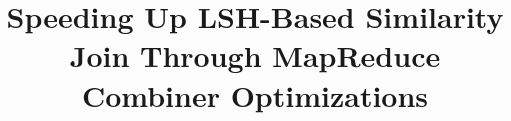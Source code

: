 \documentclass{vldb}
\begin{document}

\title{Speeding Up LSH-Based Similarity Join Through MapReduce Combiner Optimizations}



%
%
%
%

\end{document}
